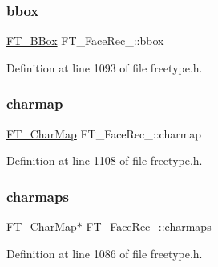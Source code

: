 \mbox{\label{struct_f_t___face_rec___a8a7b6313b5a6083e0b02c530d269417f}} 
\subsubsection{\texorpdfstring{bbox}{bbox}}
{\footnotesize\ttfamily \mbox{\hyperlink{ftimage_8h_ae341c4eb5a7199947a13b2a1dcaf7af7}{F\+T\+\_\+\+B\+Box}} F\+T\+\_\+\+Face\+Rec\+\_\+\+::bbox}



Definition at line 1093 of file freetype.\+h.

\mbox{\label{struct_f_t___face_rec___aca87d50488a5a1489741e8c13414c268}} 
\subsubsection{\texorpdfstring{charmap}{charmap}}
{\footnotesize\ttfamily \mbox{\hyperlink{freetype_8h_afc4717ddfd456a38ee15ec9c88fc7dac}{F\+T\+\_\+\+Char\+Map}} F\+T\+\_\+\+Face\+Rec\+\_\+\+::charmap}



Definition at line 1108 of file freetype.\+h.

\mbox{\label{struct_f_t___face_rec___ab629e1bee5ddf3a90997d66751e6dfe0}} 
\subsubsection{\texorpdfstring{charmaps}{charmaps}}
{\footnotesize\ttfamily \mbox{\hyperlink{freetype_8h_afc4717ddfd456a38ee15ec9c88fc7dac}{F\+T\+\_\+\+Char\+Map}}$\ast$ F\+T\+\_\+\+Face\+Rec\+\_\+\+::charmaps}



Definition at line 1086 of file freetype.\+h.

\mbox{\label{struct_f_t___face_rec___a7524f78b4f7b4e91d8c690713f8de275}} 
